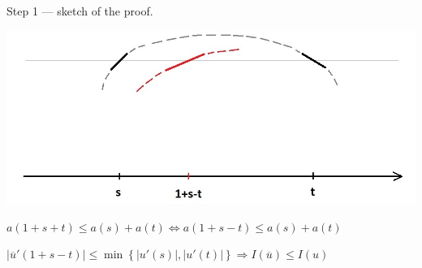 \documentclass[a4paper]{slides}
\renewcommand {\bar}[1]{\overline{#1}}
\renewcommand {\le}{\leqslant}
\newcommand{\abs}[1]{\left\vert#1\right\vert}
\begin{document}
\begin{slide}
\large
Step 1 --- sketch of the proof.
\begin{center}
\includegraphics[width=250mm]{level1}
\end{center}

$a(1 + s + t) \le a(s) + a(t) \Leftrightarrow a(1 + s - t) \le a(s) + a(t)$

$\abs{\bar{u}'(1 + s - t)} \le \min\left\{\abs{u'(s)}, \abs{u'(t)}\right\} \Rightarrow I(\bar{u}) \le I(u)$

\end{slide}
\end{document}
